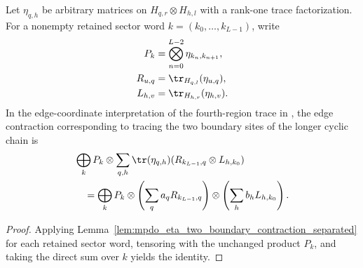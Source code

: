 \begin{lemma}
    \label{thm:mpdo_eta_fourth_region_trace_formula}
    \leanok
    Let $\eta_{q,h}$ be arbitrary matrices on
    $H_{q,r}\otimes H_{h,l}$ with a rank-one trace factorization. For a
    nonempty retained sector word $k=(k_0,\ldots,k_{L-1})$, write
    \begin{align}
        P_k     & =\bigotimes_{n=0}^{L-2}\eta_{k_n,k_{n+1}},
        \notag                                               \\
        R_{u,q} & =\tr_{H_{q,l}}(\eta_{u,q}),
        \notag                                               \\
        L_{h,v} & =\tr_{H_{h,r}}(\eta_{h,v}).
        \notag
    \end{align}
    In the edge-coordinate interpretation of the fourth-region trace in
    \cite[Appendix~C.2, lines~1606 and 1613--1617]{Cirac2016MPDO_arXiv}, the
    edge contraction corresponding to tracing the two boundary sites of the
    longer cyclic chain is
    \begin{align}
         & \bigoplus_k P_k\otimes
        \sum_{q,h}\tr(\eta_{q,h})
        (R_{k_{L-1},q}\otimes L_{h,k_0})
        \notag                    \\
         & \quad=
        \bigoplus_k P_k\otimes
        \left(\sum_q a_qR_{k_{L-1},q}\right)\otimes
        \left(\sum_h b_hL_{h,k_0}\right).
        \notag
    \end{align}
\end{lemma}

\begin{proof}\leanok
    Applying Lemma~\ref{lem:mpdo_eta_two_boundary_contraction_separated} for
    each retained sector word, tensoring with the unchanged product $P_k$, and
    taking the direct sum over $k$ yields the identity.
\end{proof}

